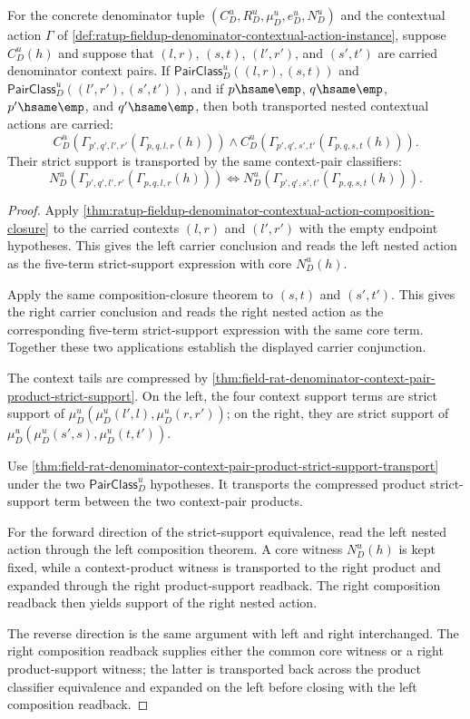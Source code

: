 \begin{theorem}
\label{thm:field-rat-denominator-contextual-action-pair-transport-carrier-support}
For the concrete denominator tuple
$(C_D^u,R_D^u,\mu_D^u,e_D^u,N_D^u)$ and the contextual action $\Gamma$ of
\autoref{def:ratup-fieldup-denominator-contextual-action-instance}, suppose
$C_D^u(h)$ and suppose that $(l,r)$, $(s,t)$, $(l',r')$, and $(s',t')$ are
carried denominator context pairs. If
$\mathsf{PairClass}_D^u((l,r),(s,t))$ and
$\mathsf{PairClass}_D^u((l',r'),(s',t'))$, and if
$p\hsame\emp$, $q\hsame\emp$, $p'\hsame\emp$, and $q'\hsame\emp$, then both
transported nested contextual actions are carried:
$$
C_D^u(\Gamma_{p',q',l',r'}(\Gamma_{p,q,l,r}(h)))
\land
C_D^u(\Gamma_{p',q',s',t'}(\Gamma_{p,q,s,t}(h))).
$$
Their strict support is transported by the same context-pair classifiers:
$$
N_D^u(\Gamma_{p',q',l',r'}(\Gamma_{p,q,l,r}(h)))
\Longleftrightarrow
N_D^u(\Gamma_{p',q',s',t'}(\Gamma_{p,q,s,t}(h))).
$$
\end{theorem}
\begin{proof}
Apply
\autoref{thm:ratup-fieldup-denominator-contextual-action-composition-closure}
to the carried contexts $(l,r)$ and $(l',r')$ with the empty endpoint
hypotheses. This gives the left carrier conclusion and reads the left nested
action as the five-term strict-support expression with core $N_D^u(h)$.

Apply the same composition-closure theorem to $(s,t)$ and $(s',t')$. This gives
the right carrier conclusion and reads the right nested action as the
corresponding five-term strict-support expression with the same core term.
Together these two applications establish the displayed carrier conjunction.

The context tails are compressed by
\autoref{thm:field-rat-denominator-context-pair-product-strict-support}. On the
left, the four context support terms are strict support of
$\mu_D^u(\mu_D^u(l',l),\mu_D^u(r,r'))$; on the right, they are strict support of
$\mu_D^u(\mu_D^u(s',s),\mu_D^u(t,t'))$.

Use
\autoref{thm:field-rat-denominator-context-pair-product-strict-support-transport}
under the two $\mathsf{PairClass}_D^u$ hypotheses. It transports the compressed
product strict-support term between the two context-pair products.

For the forward direction of the strict-support equivalence, read the left
nested action through the left composition theorem. A core witness
$N_D^u(h)$ is kept fixed, while a context-product witness is transported to the
right product and expanded through the right product-support readback. The right
composition readback then yields support of the right nested action.

The reverse direction is the same argument with left and right interchanged.
The right composition readback supplies either the common core witness or a
right product-support witness; the latter is transported back across the
product classifier equivalence and expanded on the left before closing with the
left composition readback.
\end{proof}


